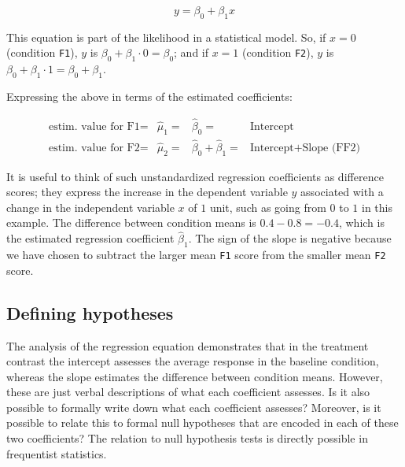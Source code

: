 \documentclass[12pt,]{krantz}
\begin{document}
\begin{equation}
y = \beta_0 + \beta_1x
\label{eq:lm1}
\end{equation}

This equation is part of the likelihood in a statistical model.
So, if \(x = 0\) (condition \texttt{F1}), \(y\) is \(\beta_0 + \beta_1 \cdot 0 = \beta_0\); and if \(x = 1\) (condition \texttt{F2}), \(y\) is \(\beta_0 + \beta_1 \cdot 1 = \beta_0 + \beta_1\).

Expressing the above in terms of the estimated coefficients:

\begin{equation}
\begin{array}{lccll}
\text{estim. value for F1} = & \hat{\mu}_1 = & \hat{\beta}_0 = & \text{Intercept} \\
\text{estim. value for F2} = & \hat{\mu}_2 = & \hat{\beta}_0 + \hat{\beta}_1 = & \text{Intercept} + \text{Slope (FF2)}
\end{array}
\label{eq:predVal}
\end{equation}

It is useful to think of such unstandardized regression coefficients as difference scores; they express the increase in the dependent variable \(y\) associated with a change in the independent variable \(x\) of \(1\) unit, such as going from \(0\) to \(1\) in this example. The difference between condition means is \(0.4 - 0.8 = -0.4\), which is the estimated regression coefficient \(\hat{\beta}_1\). The sign of the slope is negative because we have chosen to subtract the larger mean \texttt{F1} score from the smaller mean \texttt{F2} score.

\hypertarget{inverseMatrix}{%
\subsection{Defining hypotheses}\label{inverseMatrix}}

The analysis of the regression equation demonstrates that in the treatment contrast the intercept assesses the average response in the baseline condition, whereas the slope estimates the difference between condition means. However, these are just verbal descriptions of what each coefficient assesses. Is it also possible to formally write down what each coefficient assesses? Moreover, is it possible to relate this to formal null hypotheses that are encoded in each of these two coefficients? The relation to null hypothesis tests is directly possible in frequentist statistics.
\end{document}
